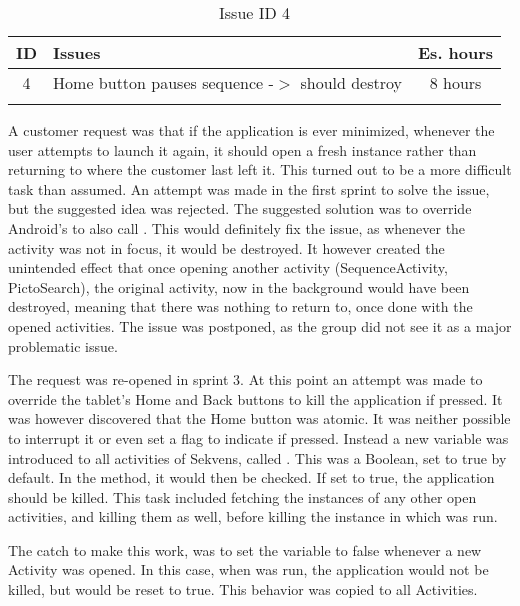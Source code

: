 \begin{longtable} { | c | p{12cm} | c | } 
\hline
	ID 	&	Issues	&		 Es. hours \\\hline
	4 	&	Home button pauses sequence -$>$ should destroy	&	8 hours \\\hline
\caption{Issue ID 4}
\label{tab:spr3_homebuttonshoulddestroy}
\end{longtable}
A customer request was that if the application is ever minimized, whenever the user attempts to launch it again, it should open a fresh instance rather than returning to where the customer last left it. This turned out to be a more difficult task than assumed. An attempt was made in the first sprint to solve the issue, but the suggested idea was rejected. The suggested solution was to override Android's  to also call . This would definitely fix the issue, as whenever the activity was not in focus, it would be destroyed. It however created the unintended effect that once opening another activity (SequenceActivity, PictoSearch), the original activity, now in the background would have been destroyed, meaning that there was nothing to return to, once done with the opened activities. The issue was postponed, as the group did not see it as a major problematic issue.

The request was re-opened in sprint 3. At this point an attempt was made to override the tablet's Home and Back buttons to kill the application if pressed. It was however discovered that the Home button was atomic. It was neither possible to interrupt it or even set a flag to indicate if pressed. Instead a new variable was introduced to all activities of Sekvens, called . This was a Boolean, set to true by default. In the  method, it would then be checked. If set to true, the application should be killed. This task included fetching the instances of any other open activities, and killing them as well, before killing the instance in which  was run.

The catch to make this work, was to set the variable to false whenever a new Activity was opened. In this case, when  was run, the application would not be killed, but  would be reset to true. This behavior was copied to all Activities.